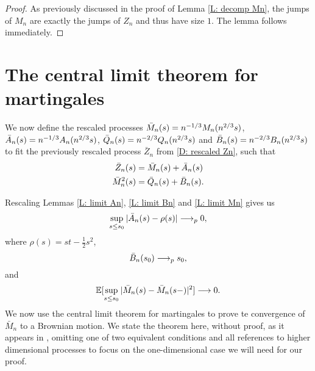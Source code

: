\begin{proof} \label{P: limit Mn}
	As previously discussed in the proof of Lemma \ref{L: decomp Mn}, the jumps of $M_n$ are exactly the jumps of $Z_n$ and thus have size $1$. The lemma follows immediately.
\end{proof}


\section{The central limit theorem for martingales}


We now define the rescaled processes 
$\bar{M}_n(s) = n^{-1 / 3}M_n(n^{2 / 3}s)$, 
$\bar{A}_n(s) = n^{-1 / 3}A_n(n^{2 / 3}s)$, 
$\bar{Q}_n(s) = n^{-2 / 3}Q_n(n^{2 / 3}s)$ and 
$\bar{B}_n(s) = n^{-2 / 3}B_n(n^{2 / 3}s)$ to fit the previously rescaled process 
$\bar{Z}_n$ from \ref{D: rescaled Zn}, such that
\begin{align*}
\bar{Z}_n(s) &= \bar{M}_n(s) + \bar{A}_n(s) \\
\bar{M}_n^2(s) &= \bar{Q}_n(s) + \bar{B}_n(s).
\end{align*}

Rescaling Lemmas \ref{L: limit An}, \ref{L: limit Bn} and \ref{L: limit Mn} gives us
\begin{equation} \label{E: limit An rescaled}
\sup_{s \leq s_0} |\bar{A}_n(s) - \rho (s)| \longrightarrow_p 0,
\end{equation}
where $\rho (s) = st - \frac{1}{2}s^2$,
\begin{equation} \label{E: limit Bn rescaled}
\bar{B}_n(s_0) \longrightarrow_p s_0,
\end{equation}
and
\begin{equation} \label{E: limit Mn rescaled}
\mathbb{E}[\sup_{s \leq s_0} | \bar{M}_n(s) - \bar{M}_n(s-) |^2 ] \longrightarrow 0.
\end{equation}
We now use the central limit theorem for martingales to prove te convergence of $\bar{M}_n$ to a Brownian motion.
We state the theorem here, without proof, as it appears in \cite[p. 339 f.]{N.Ethier1986},
omitting one of two equivalent conditions and all references to higher dimensional processes to focus on the one-dimensional case we will need for our proof.


